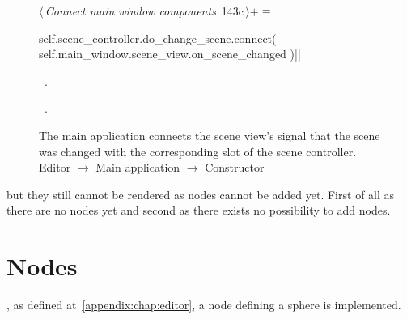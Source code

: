 \documentclass[%
    a4paper,    %
    justified,  %
    nobib,      %
    openany     %
]{tufte-book}
\makeatletter
\renewcommand{\label}[1]{\@tufte@label{##1}}%
\makeatother
\begin{document}
\begin{figure}[!htbp]
\begin{flushleft} \small
\begin{minipage}{\linewidth}\label{scrap97}\raggedright\small
{} $\langle\,${\itshape Connect main window components}\nobreak\ {\footnotesize {143c}}$\,\rangle+\equiv$
\vspace{-1ex}
\begin{pythoncode}
self.scene_controller.do_change_scene.connect(
    self.main_window.scene_view.on_scene_changed
)|\NWsep|
\end{pythoncode}
\vspace{1.5ex}
\footnotesize
\begin{list}{}{\setlength{\itemsep}{-\parsep}\setlength{\itemindent}{-\leftmargin}}
\item \NWtxtMacroDefBy\ .
\item \NWtxtMacroRefIn\ .

\item{}
\end{list}
\end{minipage}\vspace{4ex}
\end{flushleft}
\caption{The main application connects the scene view's signal that the scene
  was changed with the corresponding slot of the scene controller.
  \newline{}\newline{}Editor $\rightarrow$ Main application $\rightarrow$
  Constructor}
\end{figure}

 but they still
cannot be rendered as nodes cannot be added yet. First of all as there are no
nodes yet and second as there exists no possibility to add nodes.

\chapter{Nodes}
\label{appendix:chap:nodes}

, as defined
at~\autoref{appendix:chap:editor}, a node defining a sphere is implemented.
\end{document}
